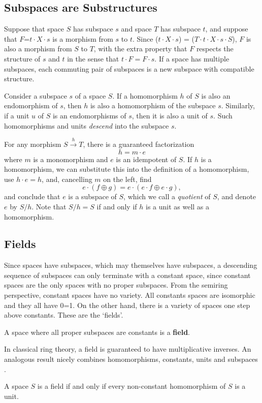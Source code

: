 \documentclass[11pt]{article}
\begin{document}
\subsection{Subspaces are Substructures} 

Suppose that space $S$ has subspace $s$ and space $T$ has subspace $t$, and suppose that $F$=$t\cdot X\cdot s$ is a morphism from $s$ to $t$.   
Since ($t\cdot X\cdot s$) = ($T\cdot t \cdot X\cdot s\cdot S$), 
$F$ is also a morphism from $S$ to $T$, with the extra property that $F$ respects the structure of $s$ and $t$ in the sense that $t\cdot F=F\cdot s$.  
If a space has multiple subspaces, each commuting pair of subspaces is a new subspace with compatible structure.  

     Consider a subspace $s$ of a space $S$.  If a homomorphism $h$ of $S$ is also an endomorphism of $s$, then $h$ is also a 
homomorphism of the subspace $s$.  Similarly, if a unit $u$ of $S$ is an endomorphisms of $s$, then it is also a unit of $s$.  Such 
homomorphisms and units {\it descend} into the subspace $s$.  

       For any morphism $S{\overset h \longrightarrow}T$, there is a guaranteed factorization  
\begin{equation}
h = m \cdot e
\end{equation}
where $m$ is a monomorphism and $e$ is an idempotent of $S$.  If $h$ is a homomorphism, we can substitute this into the 
definition of a homomorphism, use $h\cdot e=h$, and, cancelling $m$ on the left, find 
\begin{equation}
e\cdot (f\oplus g) = e\cdot (e\cdot f \oplus e\cdot g),
\end{equation}
and conclude that $e$ is a subspace of $S$, which we call a {\it quotient} of $S$, and denote $e$ by $S/h$.  Note that $S/h=S$ if and only if $h$ is a unit as well as a homomorphism. 

\subsection{Fields}

Since spaces have subspaces, which may themselves have subspaces, a descending sequence of subspaces can only terminate 
with a constant space, since constant spaces are the only spaces with no proper subspaces.  From the semiring perspective, 
constant spaces have no variety.  All constants spaces are isomorphic and they all have 0=1.  On the other hand, there is a variety of 
spaces one step above constants.  These are the `fields'.  
\begin{definition}
A space where all proper subspaces are constants is a {\bf field}.
\end{definition}
\noindent In classical ring theory, a field is guaranteed to have 
multiplicative inverses.  An analogous result nicely combines homomorphisms, constants, units and subspaces \cite{ring}.  
\begin{theorem}
A space $S$ is a field if and only if every non-constant homomorphism of $S$ is a unit. 
\end{theorem}
\end{document}
